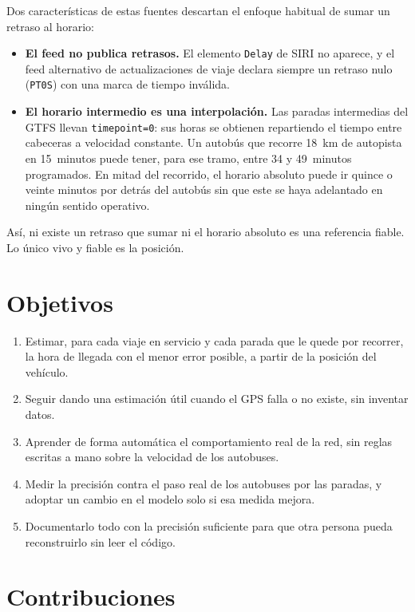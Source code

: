 Dos características de estas fuentes descartan el enfoque habitual de sumar un retraso al horario:

\begin{itemize}
  \item \textbf{El feed no publica retrasos.} El elemento \texttt{Delay} de SIRI no aparece, y el feed alternativo de
        actualizaciones de viaje declara siempre un retraso nulo (\texttt{PT0S}) con una marca de tiempo inválida.
  \item \textbf{El horario intermedio es una interpolación.} Las paradas intermedias del GTFS llevan
        \texttt{timepoint=0}: sus horas se obtienen repartiendo el tiempo entre cabeceras a velocidad constante. Un
        autobús que recorre 18~km de autopista en 15~minutos puede tener, para ese tramo, entre 34 y 49~minutos
        programados. En mitad del recorrido, el horario absoluto puede ir quince o veinte minutos por detrás del
        autobús sin que este se haya adelantado en ningún sentido operativo.
\end{itemize}

Así, ni existe un retraso que sumar ni el horario absoluto es una referencia fiable. Lo único vivo y fiable es la
posición.

\section{Objetivos}

\begin{enumerate}
  \item Estimar, para cada viaje en servicio y cada parada que le quede por recorrer, la hora de llegada con el menor
        error posible, a partir de la posición del vehículo.
  \item Seguir dando una estimación útil cuando el GPS falla o no existe, sin inventar datos.
  \item Aprender de forma automática el comportamiento real de la red, sin reglas escritas a mano sobre la velocidad
        de los autobuses.
  \item Medir la precisión contra el paso real de los autobuses por las paradas, y adoptar un cambio en el modelo solo
        si esa medida mejora.
  \item Documentarlo todo con la precisión suficiente para que otra persona pueda reconstruirlo sin leer el código.
\end{enumerate}

\section{Contribuciones}

